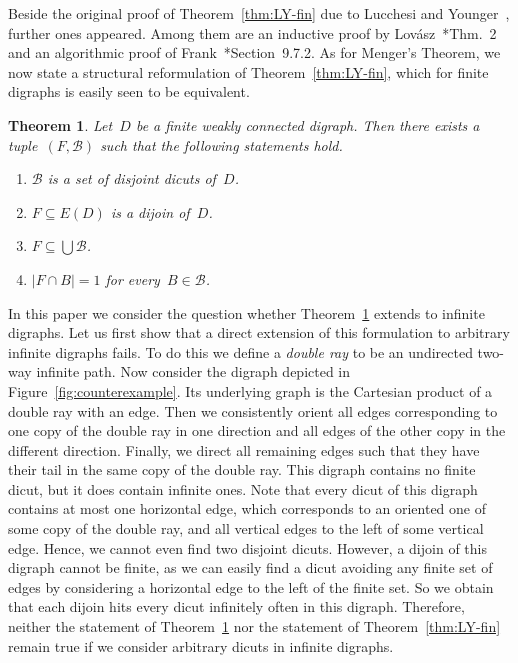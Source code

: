 \documentclass[reqno, 12pt]{amsart}
\numberwithin{equation}{section}
\numberwithin{figure}{section}
\theoremstyle{plain}
\newtheorem{theorem}[thm]{Theorem}
\theoremstyle{definition}
\newcommand{\abs}[1]{\ensuremath{{\lvert {#1} \rvert}}}
\begin{document}
Beside the original proof of Theorem~\ref{thm:LY-fin} due to 
Lucchesi and Younger~\cite{lucc-young_paper}, further ones appeared. 
Among them are 
an inductive proof by Lov\'asz~\cite{lovasz}*{Thm.~2} and 
an algorithmic proof of Frank~\cite{frank_book}*{Section~9.7.2}. 
As for Menger's Theorem, we now state a structural reformulation of Theorem~\ref{thm:LY-fin}, which for finite digraphs is easily seen to be equivalent.

\begin{theorem}
    \label{thm:LY-fin-structural}
    Let~$D$ be a finite weakly connected digraph. 
    Then there exists a tuple~${(F, \mathcal{B})}$ such that the following statements hold.
    \begin{enumerate}[label=(\roman*)]
        \item {${\mathcal{B}}$ is a set of disjoint dicuts of~$D$.}
        \item {${F \subseteq E(D)}$ is a dijoin of~$D$.}
        \item {${F \subseteq \bigcup \mathcal{B}}$.}
        \item {${\abs{F \cap B} = 1}$ for every~${B \in \mathcal{B}}$.}
    \end{enumerate}
\end{theorem}

In this paper 
we consider the question whether Theorem~\ref{thm:LY-fin-structural} extends to infinite digraphs. 
Let us first show that a direct extension of this formulation to arbitrary infinite digraphs fails. 
To do this we define a \emph{double ray} to be an undirected two-way infinite path.
Now consider the digraph depicted in Figure~\ref{fig:counterexample}. 
Its underlying graph is the Cartesian product of a double ray with an edge. 
Then we consistently orient all edges corresponding to one copy of the double ray in one direction and all edges of the other copy in the different direction. 
Finally, we direct all remaining edges such that they have their tail in the same copy of the double ray. 
This digraph contains no finite dicut, but it does contain infinite ones. 
Note that every dicut of this digraph contains at most one horizontal edge, which corresponds to an oriented one of some copy of the double ray, and all vertical edges to the left of some vertical edge. 
Hence, we cannot even find two disjoint dicuts. 
However, a dijoin of this digraph cannot be finite, as we can easily find a dicut avoiding any finite set of edges by considering a horizontal edge to the left of the finite set. 
So we obtain that each dijoin hits every dicut infinitely often in this digraph.
Therefore, neither the statement of Theorem~\ref{thm:LY-fin-structural} nor the statement of Theorem~\ref{thm:LY-fin} remain true if we consider arbitrary dicuts in infinite digraphs. 
\end{document}
